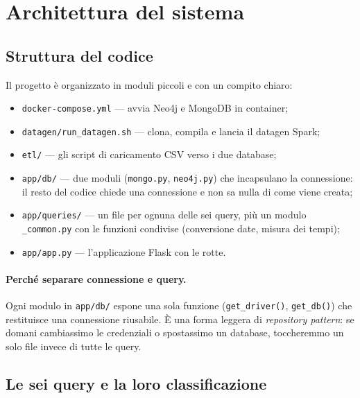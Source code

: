 \documentclass[11pt,a4paper]{article}
\begin{document}
\section{Architettura del sistema}

\subsection{Struttura del codice}

Il progetto \`e organizzato in moduli piccoli e con un compito chiaro:

\begin{itemize}[nosep]
  \item \texttt{docker-compose.yml} --- avvia Neo4j e MongoDB in container;
  \item \texttt{datagen/run\_datagen.sh} --- clona, compila e lancia il datagen Spark;
  \item \texttt{etl/} --- gli script di caricamento CSV verso i due database;
  \item \texttt{app/db/} --- due moduli (\texttt{mongo.py}, \texttt{neo4j.py})
  che incapsulano la connessione: il resto del codice chiede una connessione e
  non sa nulla di come viene creata;
  \item \texttt{app/queries/} --- un file per ognuna delle sei query, pi\`u un
  modulo \texttt{\_common.py} con le funzioni condivise (conversione date,
  misura dei tempi);
  \item \texttt{app/app.py} --- l'applicazione Flask con le rotte.
\end{itemize}

\paragraph{Perch\'e separare connessione e query.} Ogni modulo in
\texttt{app/db/} espone una sola funzione (\texttt{get\_driver()},
\texttt{get\_db()}) che restituisce una connessione riusabile. \`E una forma
leggera di \emph{repository pattern}: se domani cambiassimo le credenziali o
spostassimo un database, toccheremmo un solo file invece di tutte le query.

\subsection{Le sei query e la loro classificazione}
\end{document}
